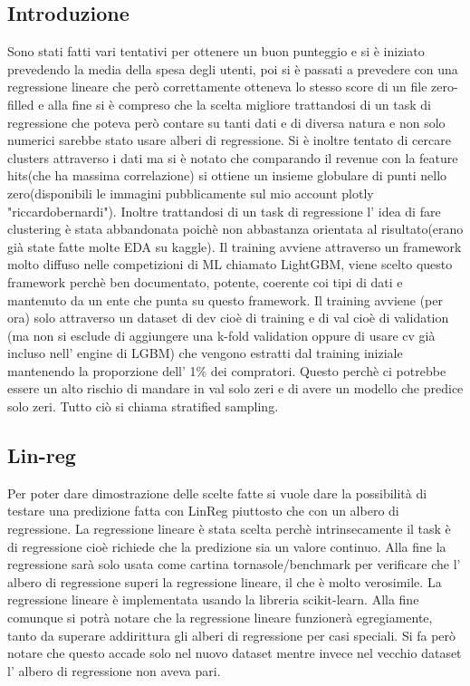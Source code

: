 \documentclass[11pt]{article}
\begin{document}
\subsection{Introduzione}\label{introduzione}

Sono stati fatti vari tentativi per ottenere un buon punteggio e si è
iniziato prevedendo la media della spesa degli utenti, poi si è passati
a prevedere con una regressione lineare che però correttamente otteneva
lo stesso score di un file zero-filled e alla fine si è compreso che la
scelta migliore trattandosi di un task di regressione che poteva però
contare su tanti dati e di diversa natura e non solo numerici sarebbe
stato usare alberi di regressione. Si è inoltre tentato di cercare
clusters attraverso i dati ma si è notato che comparando il revenue con
la feature hits(che ha massima correlazione) si ottiene un insieme
globulare di punti nello zero(disponibili le immagini pubblicamente sul
mio account plotly "riccardobernardi"). Inoltre trattandosi di un task
di regressione l' idea di fare clustering è stata abbandonata poichè non
abbastanza orientata al risultato(erano già state fatte molte EDA su
kaggle). Il training avviene attraverso un framework molto diffuso nelle
competizioni di ML chiamato LightGBM, viene scelto questo framework
perchè ben documentato, potente, coerente coi tipi di dati e mantenuto
da un ente che punta su questo framework. Il training avviene (per ora)
solo attraverso un dataset di dev cioè di training e di val cioè di
validation (ma non si esclude di aggiungere una k-fold validation oppure
di usare cv già incluso nell' engine di LGBM) che vengono estratti dal
training iniziale mantenendo la proporzione dell' 1\% dei compratori.
Questo perchè ci potrebbe essere un alto rischio di mandare in val solo
zeri e di avere un modello che predice solo zeri. Tutto ciò si chiama
stratified sampling.

\subsection{Lin-reg}\label{lin-reg}

Per poter dare dimostrazione delle scelte fatte si vuole dare la
possibilità di testare una predizione fatta con LinReg piuttosto che con
un albero di regressione. La regressione lineare è stata scelta perchè
intrinsecamente il task è di regressione cioè richiede che la predizione
sia un valore continuo. Alla fine la regressione sarà solo usata come
cartina tornasole/benchmark per verificare che l' albero di regressione
superi la regressione lineare, il che è molto verosimile. La regressione
lineare è implementata usando la libreria scikit-learn. Alla fine
comunque si potrà notare che la regressione lineare funzionerà
egregiamente, tanto da superare addirittura gli alberi di regressione
per casi speciali. Si fa però notare che questo accade solo nel nuovo
dataset mentre invece nel vecchio dataset l' albero di regressione non
aveva pari.
\end{document}
